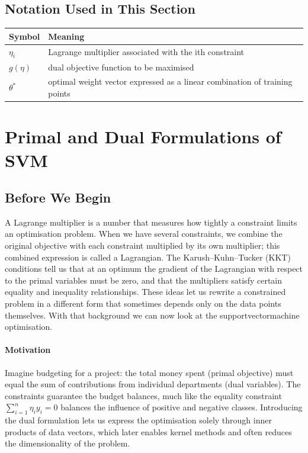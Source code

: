 \documentclass[12pt, a4paper]{article}
\begin{document}
\newpage

\subsection*{Notation Used in This Section}
\begin{tabular}{@{}ll@{}}
\toprule
Symbol & Meaning \\ \midrule
    $\eta_i$ & Lagrange multiplier associated with the ith constraint \\
    $g(\eta)$ & dual objective function to be maximised \\
    $\theta^*$ & optimal weight vector expressed as a linear combination of training points \\
\bottomrule
\end{tabular}
\vspace{1em}

\section{Primal and Dual Formulations of SVM}

\subsection{Before We Begin}
A Lagrange multiplier is a number that measures how tightly a constraint limits an optimisation problem.  
When we have several constraints, we combine the original objective with each constraint multiplied by its own multiplier; this combined expression is called a Lagrangian.  
The Karush--Kuhn--Tucker (KKT) conditions tell us that at an optimum the gradient of the Lagrangian with respect to the primal variables must be zero, and that the multipliers satisfy certain equality and inequality relationships.  
These ideas let us rewrite a constrained problem in a different form that sometimes depends only on the data points themselves.  
With that background we can now look at the supportvectormachine optimisation.

\paragraph{Motivation}
Imagine budgeting for a project: the total money spent (primal objective) must equal the sum of contributions from individual departments (dual variables). The constraints guarantee the budget balances, much like the equality constraint $\sum_{i=1}^{n} \eta_i y_i =0$ balances the influence of positive and negative classes.  
Introducing the dual formulation lets us express the optimisation solely through inner products of data vectors, which later enables kernel methods and often reduces the dimensionality of the problem.
\end{document}
